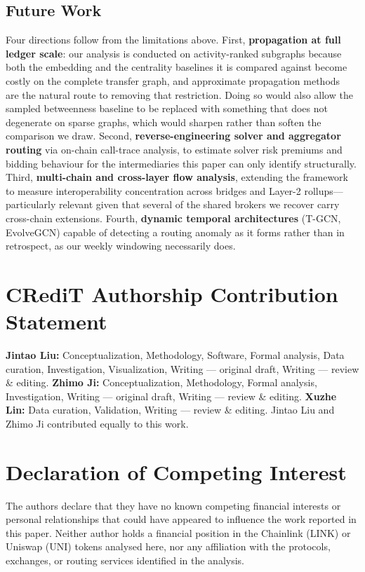 \documentclass[final,5p,times]{elsarticle}
\begin{document}
\subsection{Future Work}
\label{sec:future}
Four directions follow from the limitations above. First,
\textbf{propagation at full ledger scale}: our analysis is conducted on
activity-ranked subgraphs because both the embedding and the centrality
baselines it is compared against become costly on the complete transfer
graph, and approximate propagation methods~\cite{wang2021agp} are the
natural route to removing that restriction. Doing so would also allow the
sampled betweenness baseline to be replaced with something that does not
degenerate on sparse graphs, which would sharpen rather than soften the
comparison we draw. Second, \textbf{reverse-engineering solver and
aggregator routing} via on-chain call-trace analysis, to estimate solver
risk premiums and bidding behaviour for the intermediaries this paper can
only identify structurally. Third, \textbf{multi-chain and cross-layer flow
analysis}, extending the framework to measure interoperability concentration
across bridges and Layer-2 rollups---particularly relevant given that
several of the shared brokers we recover carry cross-chain extensions.
Fourth, \textbf{dynamic temporal architectures} (T-GCN, EvolveGCN) capable
of detecting a routing anomaly as it forms rather than in retrospect, as our
weekly windowing necessarily does.


\section*{CRediT Authorship Contribution Statement}
\textbf{Jintao Liu:} Conceptualization, Methodology, Software, Formal
analysis, Data curation, Investigation, Visualization, Writing --- original
draft, Writing --- review \& editing. 
\textbf{Zhimo Ji:} Conceptualization, Methodology, Formal analysis, 
Investigation, Writing --- original draft, Writing --- review \& editing. 
\textbf{Xuzhe Lin:} Data curation, Validation, Writing --- review \& editing. 
Jintao Liu and Zhimo Ji contributed equally to this work.

\section*{Declaration of Competing Interest}
The authors declare that they have no known competing financial interests
or personal relationships that could have appeared to influence the work
reported in this paper. Neither author holds a financial position in the
Chainlink (LINK) or Uniswap (UNI) tokens analysed here, nor any affiliation
with the protocols, exchanges, or routing services identified in the
analysis.
\end{document}
